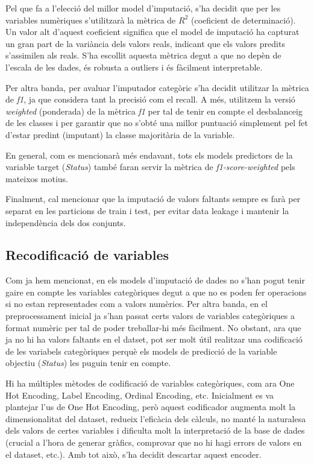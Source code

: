Pel que fa a l'elecció del millor model d'imputació, s'ha decidit que per les variables numèriques s'utilitzarà la mètrica de $R^2$ (coeficient de determinació). Un valor alt d'aquest coeficient significa que el model de imputació ha capturat un gran part de la variància dels valors reals, indicant que els valors predits s'assimilen als reals. S'ha escollit aquesta mètrica degut a que no depèn de l'escala de les dades, és robusta a outliers i és fàcilment interpretable.

Per altra banda, per avaluar l'imputador categòric s'ha decidit utilitzar la mètrica de \textit{f1}, ja que considera tant la precisió com el recall. A més, utilitzem la versió \textit{weighted} (ponderada) de la mètrica \textit{f1} per tal de tenir en compte el desbalanceig de les classes i per garantir que no s'obté una millor puntuació simplement pel fet d'estar predint (imputant) la classe majoritària de la variable.

En general, com es mencionarà més endavant, tots els models predictors de la variable target (\textit{Status}) també faran servir la mètrica de \textit{f1-score-weighted} pels mateixos motius.

Finalment, cal mencionar que la imputació de valors faltants sempre es farà per separat en les particions de train i test, per evitar data leakage i mantenir la independència dels dos conjunts.

\subsection{Recodificació de variables}
Com ja hem mencionat, en els models d'imputació de dades no s'han pogut tenir gaire en compte les variables categòriques degut a que no es poden fer operacions si no estan representades com a valors numèrics. Per altra banda, en el preprocessament inicial ja s'han passat certs valors de variables categòriques a format numèric per tal de poder treballar-hi més fàcilment. No obstant, ara que ja no hi ha valors faltants en el datset, pot ser molt útil realitzar una codificació de les variabels categòriques perquè els models de predicció de la variable objectiu (\textit{Status}) les puguin tenir en compte.

Hi ha múltiples mètodes de codificació de variables categòriques, com ara One Hot Encoding, Label Encoding, Ordinal Encoding, etc. Inicialment es va plantejar l'us de One Hot Encoding, però aquest codificador augmenta molt la dimensionalitat del dataset, redueix l'eficàcia dels càlculs, no manté la naturalesa dels valors de certes variables i dificulta molt la interpretació de la base de dades (crucial a l'hora de generar gràfics, comprovar que no hi hagi errors de valors en el dataset, etc.). Amb tot això, s'ha decidit descartar aquest encoder.

